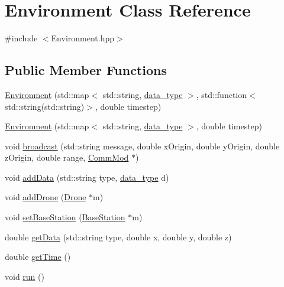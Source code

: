 \hypertarget{class_environment}{}\section{Environment Class Reference}
\label{class_environment}


{\ttfamily \#include $<$Environment.\+hpp$>$}

\subsection*{Public Member Functions}
\begin{DoxyCompactItemize}
\item 
\hyperlink{class_environment_aaddf445dbf4217a68a373e183a2bfb0c}{Environment} (std\+::map$<$ std\+::string, \hyperlink{class_environment_a7ac989afdd3bde4ea860c985ed1f8479}{data\+\_\+type} $>$, std\+::function$<$ std\+::string(std\+::string)$>$, double timestep)
\item 
\hyperlink{class_environment_a098fcd6da9a033833095ec76f60aab0d}{Environment} (std\+::map$<$ std\+::string, \hyperlink{class_environment_a7ac989afdd3bde4ea860c985ed1f8479}{data\+\_\+type} $>$, double timestep)
\item 
void \hyperlink{class_environment_a8d5bb36197739b8fb8532755210865c4}{broadcast} (std\+::string message, double x\+Origin, double y\+Origin, double z\+Origin, double range, \hyperlink{class_comm_mod}{Comm\+Mod} $\ast$)
\item 
void \hyperlink{class_environment_abadae98bdccb015d49c6f94c97a8bf82}{add\+Data} (std\+::string type, \hyperlink{class_environment_a7ac989afdd3bde4ea860c985ed1f8479}{data\+\_\+type} d)
\item 
void \hyperlink{class_environment_a95654e6bc17cbd781453fdb256fa979b}{add\+Drone} (\hyperlink{class_drone}{Drone} $\ast$m)
\item 
void \hyperlink{class_environment_aa06fdaa6619d957c10d858c176f3f307}{set\+Base\+Station} (\hyperlink{class_base_station}{Base\+Station} $\ast$m)
\item 
double \hyperlink{class_environment_a0a2b32ecbd52779d17b3d9a483aa6d24}{get\+Data} (std\+::string type, double x, double y, double z)
\item 
double \hyperlink{class_environment_a03d9d2db949b5491e60e922d9a33769b}{get\+Time} ()
\item 
void \hyperlink{class_environment_a41a43b88702fff5df95e98d10e49f541}{run} ()
\end{DoxyCompactItemize}
